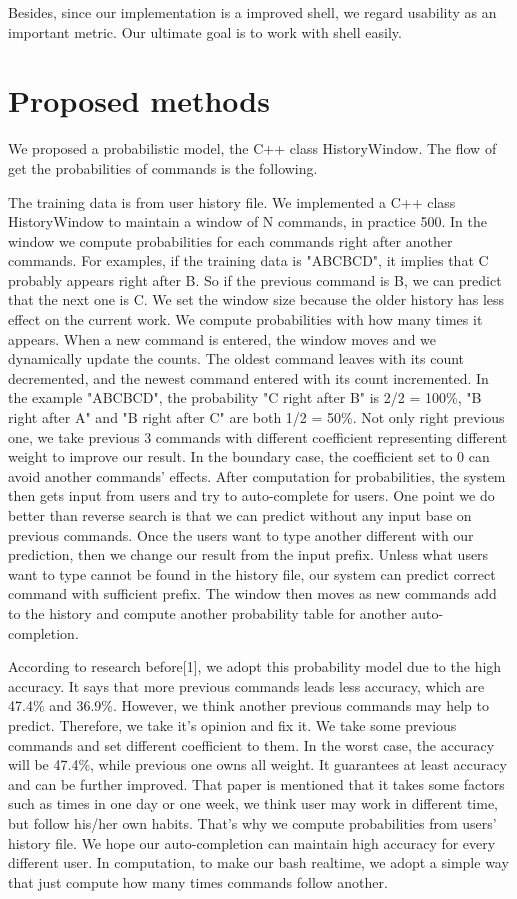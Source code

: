 \documentclass[11pt,a4paper]{article}
\begin{document}
Besides, since our implementation is a improved shell, we regard usability as an important metric.
Our ultimate goal is to work with shell easily.

\section*{Proposed methods}
We proposed a probabilistic model, the C++ class HistoryWindow.
The flow of get the probabilities of commands is the following.
\par
The training data is from user history file. 
We implemented a C++ class HistoryWindow to maintain a window of N commands, in practice 500. 
In the window we compute probabilities for each commands right after another commands. 
For examples, if the training data is "ABCBCD", it implies that C probably appears right after B.
So if the previous command is B, we can predict that the next one is C.
We set the window size because the older history has less effect on the current work. 
We compute probabilities with how many times it appears.
When a new command is entered, the window moves and we dynamically update the counts. The oldest command leaves with its count decremented, and the newest command entered with its count incremented.
In the example "ABCBCD", the probability "C right after B" is 2/2 = 100\%, 
"B right after A" and "B right after C" are both 1/2 = 50\%. 
Not only right previous one, we take previous 3 commands with different coefficient representing different weight to improve our result.
In the boundary case, the coefficient set to 0 can avoid another commands' effects. 
After computation for probabilities, the system then gets input from users and try to auto-complete for users.
One point we do better than reverse search is that we can predict without any input base on previous commands. 
Once the users want to type another different with our prediction, then we change our result from the input prefix.
Unless what users want to type cannot be found in the history file, 
our system can predict correct command with sufficient prefix.
The window then moves as new commands add to the history and compute another probability table for another auto-completion.
\par
According to research before[1], we adopt this probability model due to the high accuracy. 
It says that more previous commands leads less accuracy, which are 47.4\% and 36.9\%. 
However, we think another previous commands may help to predict. 
Therefore, we take it's opinion and fix it. 
We take some previous commands and set different coefficient to them. 
In the worst case, the accuracy will be 47.4\%, while previous one owns all weight. 
It guarantees at least accuracy and can be further improved. 
That paper is mentioned that it takes some factors such as times in one day or one week, 
we think user may work in different time, but follow his/her own habits.
That's why we compute probabilities from users' history file. 
We hope our auto-completion can maintain high accuracy for every different user. 
In computation, to make our bash realtime, we adopt a simple way that just compute how many times commands follow another. 
\end{document}
